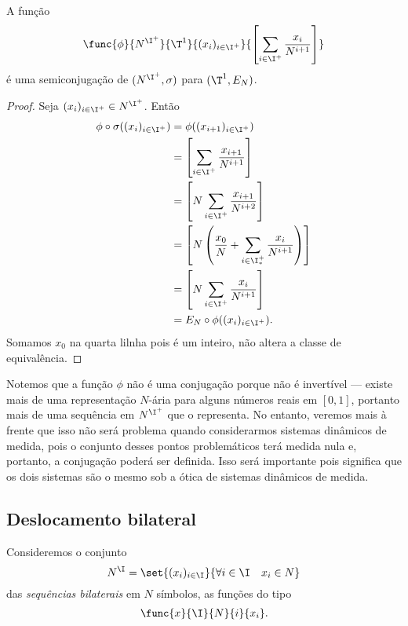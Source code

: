 \begin{proposition}
A função
	\begin{align*}
	\func{\phi}{N^{\I^+}}{\T^1}{(x_i)_{i \in \I^+}}{\left[\sum_{i \in \I^+} \frac{x_i}{N^{i+1}}\right]}
	\end{align*}
é uma semiconjugação de $(N^{\I^+},\sigma)$ para $(\T^1,E_N)$.
\end{proposition}
\begin{proof}
Seja $(x_i)_{i \in \I^+} \in N^{\I^+}$. Então
	\begin{align*}
	\phi \circ \sigma((x_i)_{i \in \I^+}) &= \phi((x_{i+1})_{i \in \I^+}) \\
			&=\left[\sum_{i \in \I^+} \frac{x_{i+1}}{N^{i+1}}\right] \\
			&=\left[N\sum_{i \in \I^+} \frac{x_{i+1}}{N^{i+2}}\right] \\
			&=\left[N \left(\frac{x_0}{N} + \sum_{i \in \I^+_*} \frac{x_{i}}{N^{i+1}}\right)\right] \\
			&=\left[N \sum_{i \in \I^+} \frac{x_{i}}{N^{i+1}}\right] \\
			&=E_N \circ \phi((x_i)_{i \in \I^+}).
	\end{align*}
Somamos $x_0$ na quarta lilnha pois é um inteiro, não altera a classe de equivalência.
\end{proof}

Notemos que a função $\phi$ não é uma conjugação porque não é invertível --- existe mais de uma representação $N$-ária para alguns números reais em $[0,1]$, portanto mais de uma sequência em $N^{\I^+}$ que o representa. No entanto, veremos mais à frente que isso não será problema quando considerarmos sistemas dinâmicos de medida, pois o conjunto desses pontos problemáticos terá medida nula e, portanto, a conjugação poderá ser definida. Isso será importante pois significa que os dois sistemas são o mesmo sob a ótica de sistemas dinâmicos de medida.


\subsection{Deslocamento bilateral}

Consideremos o conjunto
	\begin{equation*}
	N^\I = \set{(x_i)_{i \in \I}}{\forall i \in \I \quad x_i \in N}
	\end{equation*}
das \emph{sequências bilaterais} em $N$ símbolos, as funções do tipo
	\begin{align*}
	\func{x}{\I}{N}{i}{x_i}.
	\end{align*}

